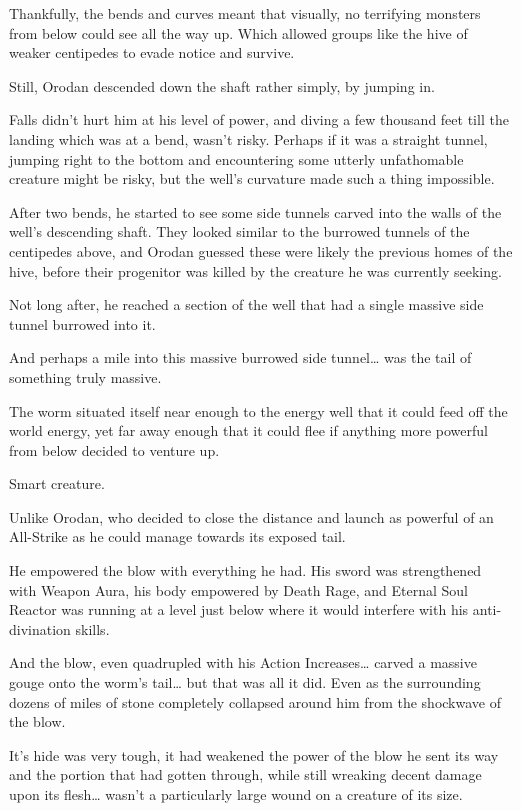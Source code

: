 \documentclass[a4paper,10pt]{book}
\begin{document}
Thankfully, the bends and curves meant that visually, no terrifying monsters from below could see all the way up. Which allowed groups like the hive of weaker centipedes to evade notice and survive.\par
Still, Orodan descended down the shaft rather simply, by jumping in.\par
Falls didn’t hurt him at his level of power, and diving a few thousand feet till the landing which was at a bend, wasn’t risky. Perhaps if it was a straight tunnel, jumping right to the bottom and encountering some utterly unfathomable creature might be risky, but the well’s curvature made such a thing impossible.\par
After two bends, he started to see some side tunnels carved into the walls of the well’s descending shaft. They looked similar to the burrowed tunnels of the centipedes above, and Orodan guessed these were likely the previous homes of the hive, before their progenitor was killed by the creature he was currently seeking.\par
Not long after, he reached a section of the well that had a single massive side tunnel burrowed into it.\par
And perhaps a mile into this massive burrowed side tunnel… was the tail of something truly massive.\par
The worm situated itself near enough to the energy well that it could feed off the world energy, yet far away enough that it could flee if anything more powerful from below decided to venture up.\par
Smart creature.\par
Unlike Orodan, who decided to close the distance and launch as powerful of an All-Strike as he could manage towards its exposed tail.\par
He empowered the blow with everything he had. His sword was strengthened with Weapon Aura, his body empowered by Death Rage, and Eternal Soul Reactor was running at a level just below where it would interfere with his anti-divination skills.\par
And the blow, even quadrupled with his Action Increases… carved a massive gouge onto the worm’s tail… but that was all it did. Even as the surrounding dozens of miles of stone completely collapsed around him from the shockwave of the blow.\par
It’s hide was very tough, it had weakened the power of the blow he sent its way and the portion that had gotten through, while still wreaking decent damage upon its flesh… wasn’t a particularly large wound on a creature of its size.\par
\end{document}
